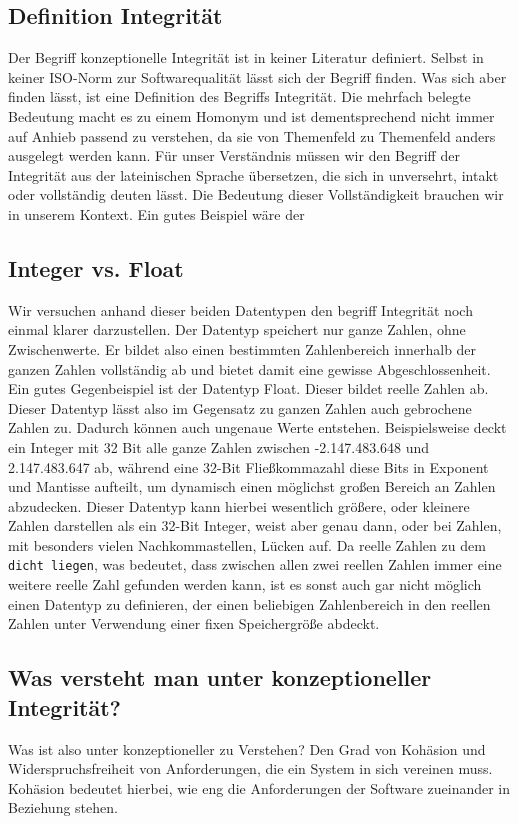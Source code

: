 \documentclass[a4paper, ngerman, 12pt, usenames, dvipsnames]{article}
\begin{document}
\subsection{Definition Integrität}
Der Begriff konzeptionelle Integrität ist in keiner Literatur definiert. Selbst in keiner ISO-Norm zur Softwarequalität lässt sich der Begriff finden. Was sich aber finden lässt, ist eine Definition des Begriffs Integrität. Die mehrfach belegte Bedeutung macht es zu einem Homonym und ist dementsprechend nicht immer auf Anhieb passend zu verstehen, da sie von Themenfeld zu Themenfeld anders ausgelegt werden kann. Für unser Verständnis müssen wir den Begriff der Integrität aus der lateinischen Sprache übersetzen, die sich in unversehrt, intakt oder vollständig deuten lässt. Die Bedeutung dieser Vollständigkeit brauchen wir in unserem Kontext. Ein gutes Beispiel wäre der 
\subsection{Integer vs. Float}
Wir versuchen anhand dieser beiden Datentypen den begriff Integrität noch einmal klarer darzustellen. Der Datentyp speichert nur ganze Zahlen, ohne Zwischenwerte. Er bildet also einen bestimmten Zahlenbereich innerhalb der ganzen Zahlen vollständig ab und bietet damit eine gewisse Abgeschlossenheit. Ein gutes Gegenbeispiel ist der Datentyp Float. Dieser bildet reelle Zahlen ab. Dieser Datentyp lässt also im Gegensatz zu ganzen Zahlen auch gebrochene Zahlen zu. Dadurch können auch ungenaue Werte entstehen. Beispielsweise deckt ein Integer mit 32 Bit alle ganze Zahlen zwischen -2.147.483.648 und 2.147.483.647 ab, während eine 32-Bit Fließkommazahl diese Bits in Exponent und Mantisse aufteilt, um dynamisch einen möglichst großen Bereich an Zahlen abzudecken. Dieser Datentyp kann hierbei wesentlich größere, oder kleinere Zahlen darstellen als ein 32-Bit Integer, weist aber genau dann, oder bei Zahlen, mit besonders vielen Nachkommastellen, Lücken auf. Da reelle Zahlen zu dem \texttt{dicht liegen}, was bedeutet, dass zwischen allen zwei reellen Zahlen immer eine weitere reelle Zahl gefunden werden kann, ist es sonst auch gar nicht möglich einen Datentyp zu definieren, der einen beliebigen Zahlenbereich in den reellen Zahlen unter Verwendung einer fixen Speichergröße abdeckt.

\subsection{Was versteht man unter konzeptioneller Integrität?}
Was ist also unter konzeptioneller zu Verstehen?
Den Grad von Kohäsion und Widerspruchsfreiheit von Anforderungen, die ein System in sich vereinen muss. Kohäsion bedeutet hierbei, wie eng die Anforderungen der Software zueinander in Beziehung stehen.
\end{document}
